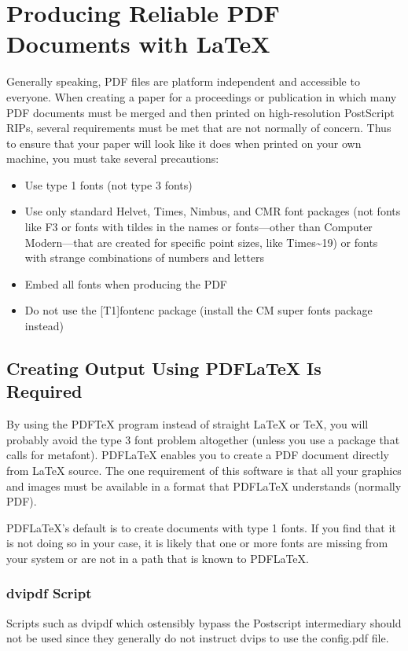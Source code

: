 \documentclass[letterpaper]{article}
\begin{document}
\section{Producing Reliable PDF\\Documents with \LaTeX{}}
Generally speaking, PDF files are platform independent and accessible to everyone. When creating a paper for a proceedings or publication in which many PDF documents must be merged and then printed on high-resolution PostScript RIPs, several requirements must be met that are not normally of concern. Thus to ensure that your paper will look like it does when printed on your own machine, you must take several precautions:
\begin{itemize}
\item Use type 1 fonts (not type 3 fonts)
\item Use only standard Helvet, Times, Nimbus, and CMR font packages (not fonts like F3 or fonts with tildes in the names or fonts---other than Computer Modern---that are created for specific point sizes, like Times\~{}19) or fonts with strange combinations of numbers and letters
\item Embed all fonts when producing the PDF
\item Do not use the [T1]{fontenc} package (install the CM super fonts package instead)
\end{itemize}

\subsection{Creating Output Using PDF\LaTeX{} Is Required}
By using the PDF\TeX{} program instead of straight \LaTeX{} or \TeX{}, you will probably avoid the type 3 font problem altogether (unless you use a package that calls for metafont). PDF\LaTeX{} enables you to create a PDF document directly from \LaTeX{} source. The one requirement of this software is that all your graphics and images must be available in a format that PDF\LaTeX{} understands (normally PDF).

PDF\LaTeX{}'s default is to create documents with type 1 fonts. If you find that it is not doing so in your case, it is likely that one or more fonts are missing from your system or are not in a path that is known to PDF\LaTeX{}.

\subsubsection{dvipdf Script}
Scripts such as dvipdf which ostensibly bypass the Postscript intermediary should not be used since they generally do not instruct dvips to use the config.pdf file.
\end{document}
